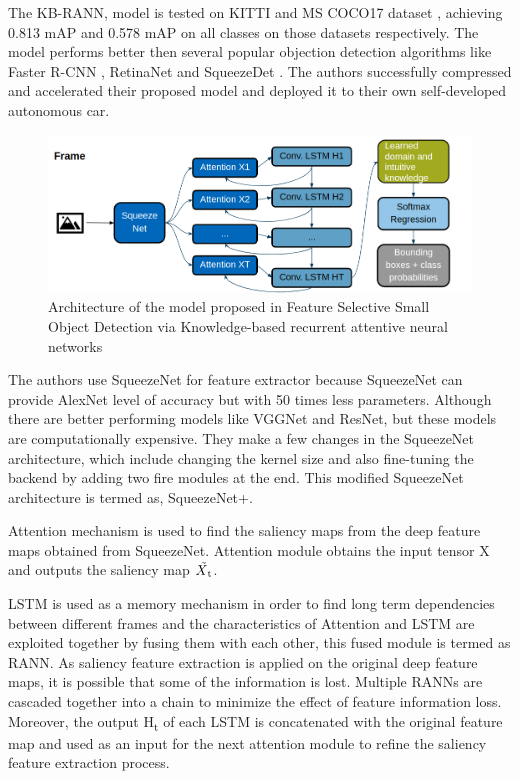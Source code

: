 \documentclass[conference]{IEEEtran}
\begin{document}
The KB-RANN, model is tested on KITTI and MS COCO17 dataset \cite{b31}, achieving 0.813 mAP and 0.578 mAP on all classes on those datasets respectively. The model performs better then several popular objection detection algorithms like Faster R-CNN \cite{b15}, RetinaNet \cite{b32} and SqueezeDet \cite{b33}.
The authors successfully compressed and accelerated their proposed model and deployed it to their own self-developed autonomous car. \newline

\begin{figure}[h]
\includegraphics[width=\columnwidth]{KB-RANN-architecture}
\caption{Architecture of the model proposed in Feature Selective Small Object Detection via Knowledge-based recurrent attentive neural networks}
\end{figure}

The authors use SqueezeNet\cite{b34} for feature extractor because SqueezeNet can provide AlexNet level of accuracy but with 50 times less parameters. Although there are better performing models like VGGNet\cite{b45} and ResNet\cite{b40}, but these models are computationally expensive. They make a few changes in the SqueezeNet architecture, which include changing the kernel size and also fine-tuning the backend by adding two fire modules at the end. This modified SqueezeNet architecture is termed as, SqueezeNet+. \newline

Attention mechanism is used to find the saliency maps from the deep feature maps obtained from SqueezeNet. Attention module obtains the input tensor X and outputs the saliency map $\tilde{X\textsubscript{t}}$. \newline

LSTM \cite{b18} is used as a memory mechanism in order to find long term dependencies between different frames and the characteristics of Attention and LSTM are exploited together by fusing them with each other, this fused module is termed as RANN. As saliency feature extraction is applied on the original deep feature maps, it is possible that some of the information is lost. Multiple RANNs are cascaded together into a chain to minimize the effect of feature information loss. Moreover, the output H\textsubscript{t} of each LSTM is concatenated with the original feature map and used as an input for the next attention module to refine the saliency feature extraction process. \newline
\end{document}
